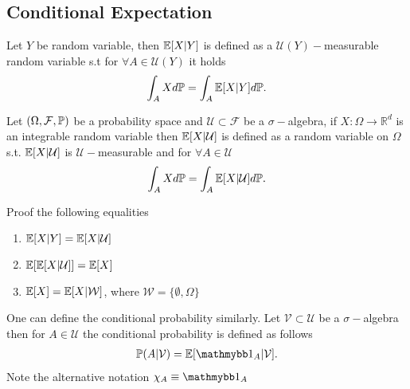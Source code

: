 \subsection{Conditional Expectation}
\begin{definition}
  Let $Y$ be random variable, then $\E[X|  Y] $ is defined as a $\mathcal{U}(Y)-$measurable random variable
  s.t for $\forall  A \in \mathcal{U}(Y)$ it holds 
  \begin{align*}
    \int_A X d\P = \int_A \E[X|Y] d\P
  .\end{align*}
\end{definition}
\begin{definition}
 Let $(\Omega ,\mathcal{F},\P)$  be a probability space and $\mathcal{ U} \subset  \mathcal{F}$ be a $\sigma-$algebra,
 if $X  : \Omega  \to  \mathbb{R}^{d} $ is an integrable random variable then $\E[X |\mathcal{U}]$  is
 defined as a random variable on $\Omega$ s.t. $\E[X | \mathcal{U}]$ is $\mathcal{U}-$measurable and for $\forall A \in  \mathcal{U}$
 \begin{align*}
   \int_A X d\P  = \int_A \E[X | \mathcal{U}] d \P
 .\end{align*}
\end{definition}
\begin{exercise}
 Proof the following equalities  
 \begin{enumerate}
   \item $\E[X|Y] = \E[X | \mathcal{U}]$
   \item $\E[\E[X|\mathcal{U}]] = \E[X]$
   \item $\E[X] = \E[X | \mathcal{W}]$, where $\mathcal{W} = \{\emptyset,\Omega \}  $
 \end{enumerate}
\end{exercise}
\begin{remark}
 One can define the conditional probability similarly. Let $\mathcal{V} \subset  \mathcal{U}$  be a $\sigma-$algebra 
 then for $A \in  \mathcal{U}$ the conditional probability is defined as follows
 \begin{align*}
   \P(A | \mathcal{V}) = \E[\cha_A | \mathcal{V}]
 .\end{align*}
Note the alternative notation $\chi_A \equiv \cha_A$
\end{remark}

